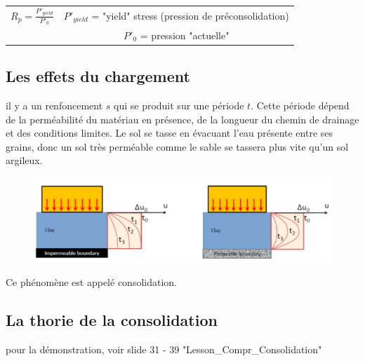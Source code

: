 \medskip

\begin{center}
\begin{tabular}{c|c}
    $R_p = \frac{P'_{yield}}{P'_0}$  &   $P'_{yield}$ = "yield" stress (pression de préconsolidation)  \\
      &  $P'_0$ = pression "actuelle"     
\end{tabular}
\end{center}

\subsection{Les effets du chargement}

il y a un renfoncement $s$ qui se produit sur une période $t$. Cette période dépend de la perméabilité du matériau en présence, de la longueur du chemin de drainage et des conditions limites. Le sol se tasse en évacuant l'eau présente entre ses grains, donc un sol très perméable comme le sable se tassera plus vite qu'un sol argileux. 

\begin{figure}[h!]
\center
   \includegraphics[scale=1]{Verastegui/images/V2.PNG}
\end{figure}

Ce phénomène est appelé consolidation.

\subsection{La thorie de la consolidation}

pour la démonstration, voir slide 31 - 39 "Lesson\_Compr\_Consolidation"

